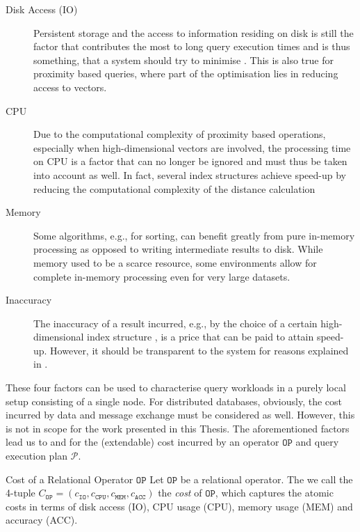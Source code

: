 \begin{description}
    \item[Disk Access (IO)] Persistent storage and the access to information residing on disk is still the factor that contributes the most to long query execution times and is thus something, that a system should try to minimise \cite{Selinger:1979Access}. This is also true for proximity based queries, where part of the optimisation lies in reducing access to vectors.
    \item[CPU] Due to the computational complexity of proximity based operations, especially when high-dimensional vectors are involved, the processing time on CPU is a factor that can no longer be ignored and must thus be taken into account as well. In fact, several index structures achieve speed-up by reducing the computational complexity of the distance calculation \cite{Weber:1998Va,Jegou:2010Product}
    \item[Memory] Some algorithms, e.g., for sorting, can benefit greatly from pure in-memory processing as opposed to writing intermediate results to disk. While memory used to be a scarce resource, some environments allow for complete in-memory processing even for very large datasets.
    \item[Inaccuracy] The inaccuracy of a result incurred, e.g., by the choice of a certain high-dimensional index structure \cite{Indyk1998:Approximate,Jegou:2010Product}, is a price that can be paid to attain speed-up. However, it should be transparent to the system for reasons explained in .
\end{description}

These four factors can be used to characterise query workloads in a purely local setup consisting of a single node. For distributed databases, obviously, the cost incurred by data and message exchange must be considered as well. However, this is not in scope for the work presented in this Thesis. The aforementioned factors lead us to  and   for the (extendable) cost incurred by an operator $\mathtt{OP}$ and query execution plan $\mathcal{P}$.

\begin{definition}[label=definition:op_cost]{Cost of a Relational Operator $\mathtt{OP}$}{}
    Let $\mathtt{OP}$ be a relational operator. The we call the 4-tuple $C_{\mathtt{OP}} = (c_{\mathtt{IO}}, c_{\mathtt{CPU}}, c_{\mathtt{MEM}},c_{\mathtt{ACC}})$ the \emph{cost} of $\mathtt{OP}$, which captures the atomic costs in terms of disk access (IO), CPU usage (CPU), memory usage (MEM) and accuracy (ACC).
\end{definition}

